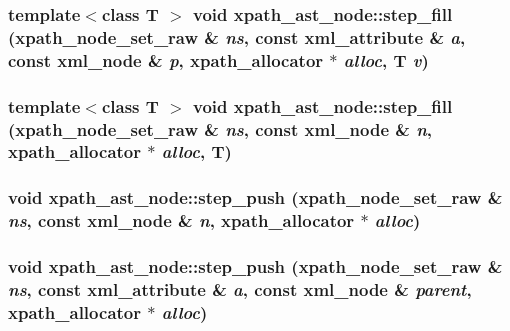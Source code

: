 \label{classxpath__ast__node_a326147ab8def5110e44deafd73b20393}
\hypertarget{classxpath__ast__node_a0da76bbadd9b254cf56649392c686c2a}{
\subsubsection[{step\_\-fill}]{\setlength{\rightskip}{0pt plus 5cm}template$<$class T $>$ void xpath\_\-ast\_\-node::step\_\-fill ({\bf xpath\_\-node\_\-set\_\-raw} \& {\em ns}, \/  const xml\_\-attribute \& {\em a}, \/  const xml\_\-node \& {\em p}, \/  {\bf xpath\_\-allocator} $\ast$ {\em alloc}, \/  T {\em v})}}
\label{classxpath__ast__node_a0da76bbadd9b254cf56649392c686c2a}
\hypertarget{classxpath__ast__node_a2fb0bf78cbdbe0bb032d37f765eab816}{
\subsubsection[{step\_\-fill}]{\setlength{\rightskip}{0pt plus 5cm}template$<$class T $>$ void xpath\_\-ast\_\-node::step\_\-fill ({\bf xpath\_\-node\_\-set\_\-raw} \& {\em ns}, \/  const xml\_\-node \& {\em n}, \/  {\bf xpath\_\-allocator} $\ast$ {\em alloc}, \/  T)}}
\label{classxpath__ast__node_a2fb0bf78cbdbe0bb032d37f765eab816}
\hypertarget{classxpath__ast__node_a7083f1a6c3d4128bb8a4ac147851a86b}{
\subsubsection[{step\_\-push}]{\setlength{\rightskip}{0pt plus 5cm}void xpath\_\-ast\_\-node::step\_\-push ({\bf xpath\_\-node\_\-set\_\-raw} \& {\em ns}, \/  const xml\_\-node \& {\em n}, \/  {\bf xpath\_\-allocator} $\ast$ {\em alloc})}}
\label{classxpath__ast__node_a7083f1a6c3d4128bb8a4ac147851a86b}
\hypertarget{classxpath__ast__node_aa141bfbd4d5e42da83f0de8f729eb849}{
\subsubsection[{step\_\-push}]{\setlength{\rightskip}{0pt plus 5cm}void xpath\_\-ast\_\-node::step\_\-push ({\bf xpath\_\-node\_\-set\_\-raw} \& {\em ns}, \/  const xml\_\-attribute \& {\em a}, \/  const xml\_\-node \& {\em parent}, \/  {\bf xpath\_\-allocator} $\ast$ {\em alloc})}}
